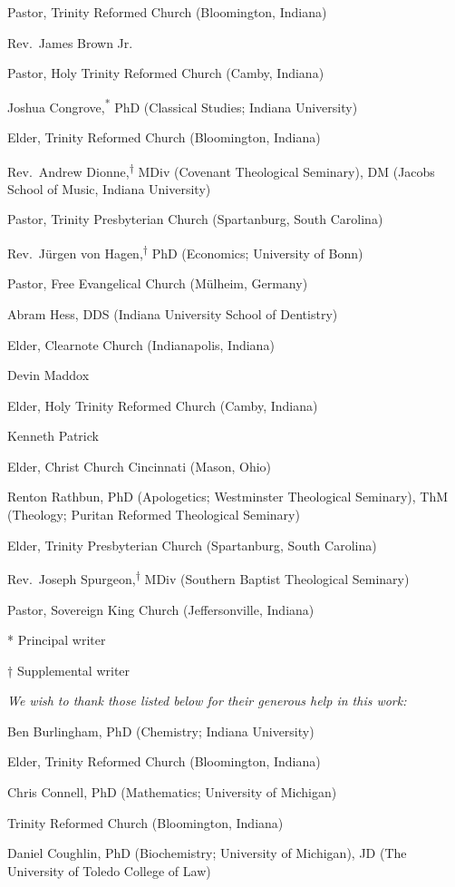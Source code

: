 \documentclass[
]{book}
\begin{document}
Pastor, Trinity Reformed Church (Bloomington, Indiana)

Rev.~James Brown Jr.

Pastor, Holy Trinity Reformed Church (Camby, Indiana)

Joshua Congrove,\textsuperscript{*} PhD (Classical Studies; Indiana University)

Elder, Trinity Reformed Church (Bloomington, Indiana)

Rev.~Andrew Dionne,\textsuperscript{†} MDiv (Covenant Theological Seminary), DM (Jacobs School of Music, Indiana University)

Pastor, Trinity Presbyterian Church (Spartanburg, South Carolina)

Rev.~Jürgen von Hagen,\textsuperscript{†} PhD (Economics; University of Bonn)

Pastor, Free Evangelical Church (Mülheim, Germany)

Abram Hess, DDS (Indiana University School of Dentistry)

Elder, Clearnote Church (Indianapolis, Indiana)

Devin Maddox

Elder, Holy Trinity Reformed Church (Camby, Indiana)

Kenneth Patrick

Elder, Christ Church Cincinnati (Mason, Ohio)

Renton Rathbun, PhD (Apologetics; Westminster Theological Seminary), ThM (Theology; Puritan Reformed Theological Seminary)

Elder, Trinity Presbyterian Church (Spartanburg, South Carolina)

Rev.~Joseph Spurgeon,\textsuperscript{†} MDiv (Southern Baptist Theological Seminary)

Pastor, Sovereign King Church (Jeffersonville, Indiana)

* Principal writer

† Supplemental writer

\emph{We wish to thank those listed below for their generous help in this work:}

Ben Burlingham, PhD (Chemistry; Indiana University)

Elder, Trinity Reformed Church (Bloomington, Indiana)

Chris Connell, PhD (Mathematics; University of Michigan)

Trinity Reformed Church (Bloomington, Indiana)

Daniel Coughlin, PhD (Biochemistry; University of Michigan), JD (The University of Toledo College of Law)
\end{document}
